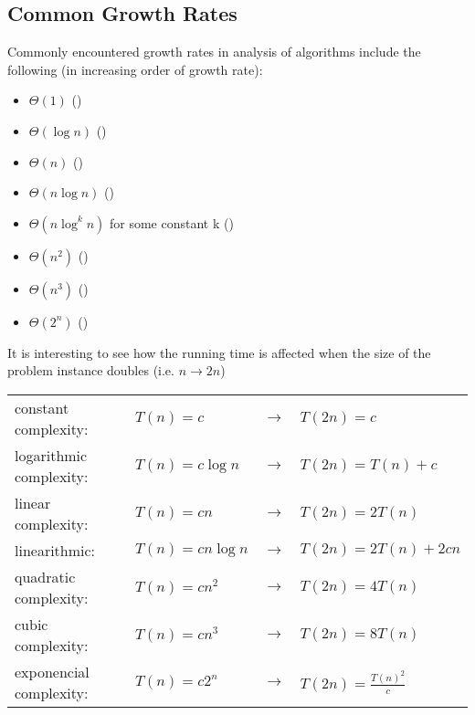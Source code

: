 \documentclass[letterpaper, 12pt]{article}
\newcommand{\red}[1]{{\color{red}{#1}}}
\begin{document}
    \subsection{Common Growth Rates}
    Commonly encountered growth rates in analysis of algorithms include the following (in increasing order of growth rate):
    \begin{itemize}
        \item $\Theta(1)$ (\red{constant complexity})
        \item $\Theta(\log n)$ (\red{logarithmic complexity})
        \item $\Theta(n)$ (\red{linear complexity})
        \item $\Theta(n\log n)$ (\red{linearithmic})
        \item $\Theta(n \log^k n)$ for some constant k (\red{quasi-linear})
        \item $\Theta(n^2)$ (\red{quadratic complexity})
        \item $\Theta(n^3)$ (\red{cubic complexity})
        \item $\Theta(2^n)$ (\red{exponencial complexity})
    \end{itemize}
    \bigskip
    It is interesting to see how the running time is affected when the size of the problem instance doubles (i.e. $n \rightarrow 2n$)
    \bigskip
    \begin{tabular}{l|lcl}
        constant complexity: & $T(n) = c$ & $\rightarrow$ & $T(2n) = c$\\
        logarithmic complexity: & $T(n) = c\log n$ & $\rightarrow$ & $T(2n) = T(n) + c$\\
        linear complexity: & $T(n) = cn$ & $\rightarrow$ & $T(2n) = 2T(n)$\\
        linearithmic: & $T(n) = cn\log n$ & $\rightarrow$ & $T(2n) = 2T(n) + 2cn$\\
        quadratic complexity: & $T(n) = cn^2$ & $\rightarrow$ & $T(2n) = 4T(n)$\\
        cubic complexity: & $T(n) = cn^3$ & $\rightarrow$ & $T(2n) = 8T(n)$\\
        exponencial complexity: & $T(n) = c2^n$ & $\rightarrow$ & $T(2n) = \frac{T(n)^2}{c}$\\
    \end{tabular}
    \pagebreak
\end{document}
